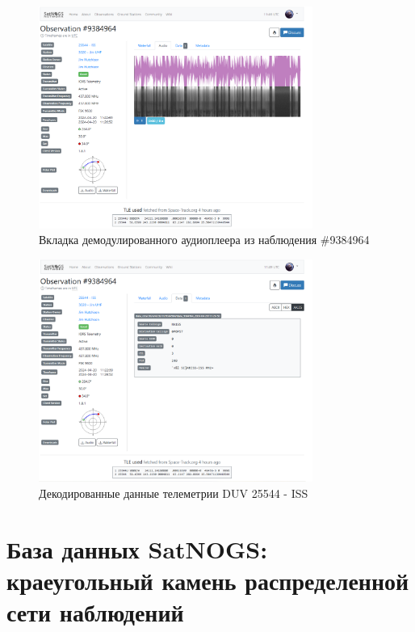 \documentclass[14pt, a4paper]{../cls/coursework}
\begin{document}
    \begin{figure}[htbp]
        \centering
        \includegraphics[width=0.8\textwidth]{satnogs_decoded_telemetry_example}
        \caption{Вкладка демодулированного аудиоплеера из наблюдения \#9384964}
        \label{fig:satnogs_decoded_telemetry_example}
    \end{figure}


    \begin{figure}[htbp]
        \centering
        \includegraphics[width=0.8\textwidth]{satnogs_observation_data_example}
        \caption{Декодированные данные телеметрии DUV 25544 - ISS}
        \label{fig:satnogs_observation_data_example}
    \end{figure}

    \section{База данных SatNOGS: краеугольный камень распределенной сети наблюдений}
\end{document}
